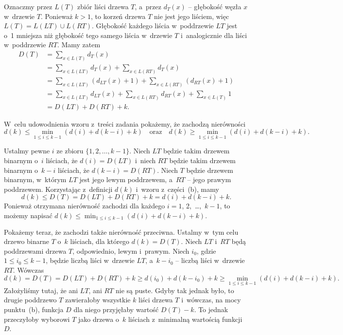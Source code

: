 \subproblem %
Oznaczmy przez $L(T)$ zbiór liści drzewa $T$, a~przez $d_T(x)$ -- głębokość węzła $x$ w~drzewie $T$.
Ponieważ $k>1$, to korzeń drzewa $T$ nie jest jego liściem, więc $L(T)=L(LT)\cup L(RT)$.
Głębokość każdego liścia w~poddrzewie $LT$ jest o~1 mniejsza niż głębokość tego samego liścia w~drzewie $T$ i~analogicznie dla liści w~poddrzewie $RT$.
Mamy zatem
\begin{align*}
    D(T) &= \sum_{x\in L(T)}d_T(x) \\
	&= \sum_{x\in L(LT)}d_T(x)+\sum_{x\in L(RT)}d_T(x) \\
	&= \sum_{x\in L(LT)}(d_{LT}(x)+1)+\sum_{x\in L(RT)}(d_{RT}(x)+1) \\
	&= \sum_{x\in L(LT)}d_{LT}(x)+\sum_{x\in L(RT)}d_{RT}(x)+\sum_{x\in L(T)}1 \\[1mm]
	&= D(LT)+D(RT)+k.
\end{align*}

\subproblem %

\noindent W~celu udowodnienia wzoru z~treści zadania pokażemy, że zachodzą nierówności
\[
    d(k) \le \min_{1\le i\le k-1}(d(i)+d(k-i)+k) \quad\text{oraz}\quad d(k) \ge \min_{1\le i\le k-1}(d(i)+d(k-i)+k).
\]

Ustalmy pewne $i$ ze zbioru $\{1,2,\dots,k-1\}$.
Niech $LT$ będzie takim drzewem binarnym o~$i$ liściach, że $d(i)=D(LT)$ i~niech $RT$ będzie takim drzewem binarnym o~$k-i$ liściach, że $d(k-i)=D(RT)$.
Niech $T$ będzie drzewem binarnym, w~którym $LT$ jest jego lewym poddrzewem, a~$RT$ -- jego prawym poddrzewem.
Korzystając z~definicji $d(k)$ i~wzoru z~części~(b), mamy
\[
    d(k) \le D(T) = D(LT)+D(RT)+k = d(i)+d(k-i)+k.
\]
Ponieważ otrzymana nierówność zachodzi dla każdego $i=1$, 2,~\dots,~$k-1$, to możemy napisać $d(k)\le\min_{1\le i\le k-1}(d(i)+d(k-i)+k)$.

Pokażemy teraz, że zachodzi także nierówność przeciwna.
Ustalmy w~tym celu drzewo binarne $T$ o~$k$ liściach, dla którego $d(k)=D(T)$.
Niech $LT$ i~$RT$ będą poddrzewami drzewa $T$, odpowiednio, lewym i~prawym.
Niech $i_0$, gdzie $1\le i_0\le k-1$, będzie liczbą liści w~drzewie $LT$, a~$k-i_0$ -- liczbą liści w~drzewie $RT$.
Wówczas
\[
    d(k) = D(T) = D(LT)+D(RT)+k \ge d(i_0)+d(k-i_0)+k \ge \min_{1\le i\le k-1}(d(i)+d(k-i)+k).
\]
Założyliśmy tutaj, że ani $LT$, ani $RT$ nie są puste.
Gdyby tak jednak było, to drugie poddrzewo $T$ zawierałoby wszystkie $k$ liści drzewa $T$ i~wówczas, na mocy punktu~(b), funkcja $D$ dla niego przyjęłaby wartość $D(T)-k$.
To jednak przeczyłoby wyborowi $T$ jako drzewa o~$k$ liściach z~minimalną wartością funkcji $D$.

